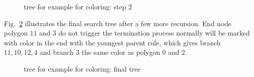     \begin{figure}[h!]
        \centering
        \caption[Tree for example for coloring: step 2]{tree for example for coloring: step 2}
        \label{qdt_fig:qdt_color_tree_1}
    \end{figure}
Fig.~\ref{qdt_fig:qdt_color_tree_2} illustrates the final search tree after a few more recursion.
End node polygon $11$ and $3$ do not trigger the termination process normally will be marked with color in the end with the youngest parent rule, which gives branch $11,10,12,4$ and branch $3$ the same color as polygon $0$ and $2$.

    \begin{figure}[h!]
        \centering
        \caption[Tree for example for coloring: final tree]{tree for example for coloring: final tree}
        \label{qdt_fig:qdt_color_tree_2}
    \end{figure}

\pagebreak